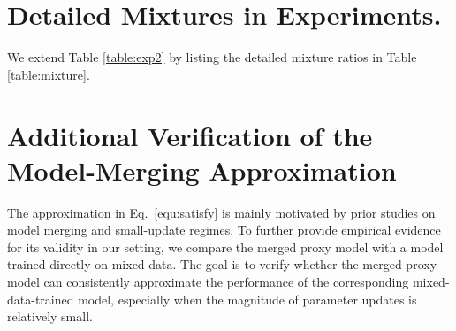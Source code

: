 


\section{Detailed Mixtures in Experiments.}
\label{appd:mixture}



We extend Table \ref{table:exp2} by listing the detailed mixture ratios in Table \ref{table:mixture}.

\section{Additional Verification of the Model-Merging Approximation}
\label{appd:merge_verification}

The approximation in Eq.~\ref{equ:satisfy} is mainly motivated by prior studies on model merging and small-update regimes. 
To further provide empirical evidence for its validity in our setting, we compare the merged proxy model with a model trained directly on mixed data. 
The goal is to verify whether the merged proxy model can consistently approximate the performance of the corresponding mixed-data-trained model, especially when the magnitude of parameter updates is relatively small.

